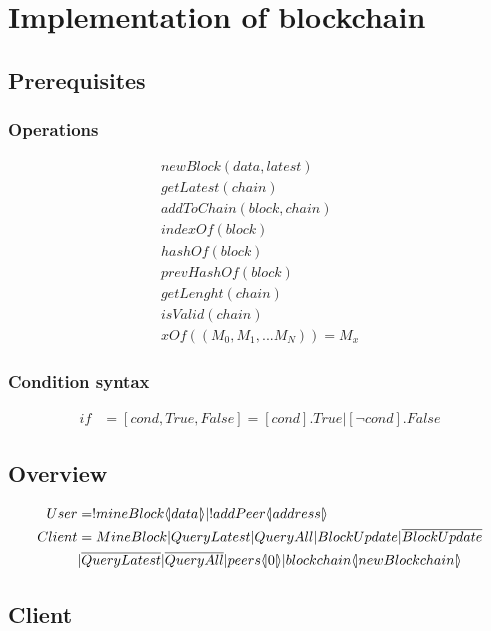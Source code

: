 \section{Implementation of blockchain}

\subsection{Prerequisites}

\subsubsection{Operations}

\begin{align*}
	newBlock(data,latest)\\
	getLatest(chain)\\
	addToChain(block,chain)\\
	indexOf(block)\\
	hashOf(block)\\
	prevHashOf(block)\\
	getLenght(chain)\\
	isValid(chain)\\
	xOf((M_0,M_1,...M_N))=M_x
\end{align*}

\subsubsection{Condition syntax}

\begin{align*}
	if &= [cond,True,False] = [cond].True|[\neg cond].False
\end{align*}

\subsection{Overview}

\begin{align*}
	User &= !mineBlock \lift{}{data} |!addPeer\lift{}{address}\\
	Client &= MineBlock|QueryLatest|QueryAll|BlockUpdate|\overline{BlockUpdate}\\
	&|\overline{QueryLatest}|\overline{QueryAll}|peers\lift{}{0}|blockchain\lift{}{newBlockchain}
\end{align*}

\subsection{Client}

